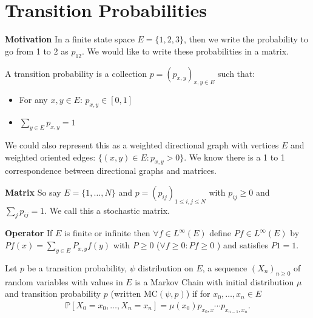 \section{Transition Probabilities}
\textbf{Motivation} In a finite state space $E=\{1,2,3\}$, then we write the probability to go from 1 to 2 as $p_{12}$. We would like to write these probabilities in a matrix.

\begin{defn}
	A transition probability is a collection $p=(p_{x,y})_{x,y \in E}$ such that:
	\begin{itemize}
		\item For any $x,y \in E$: $p_{x,y}\in [0,1]$ 
		\item $\sum_{y \in E} p_{x,y}=1$
	\end{itemize}
	
\end{defn}

We could also represent this as a weighted directional graph with vertices $E$ and weighted oriented edges: $\{(x,y) \in E: p_{x,y}>0\}$. We know there is a 1 to 1 correspondence between directional graphs and matrices.

\textbf{Matrix} So say $E=\{1,\ldots,N\}$ and $p=(p_{ij})_{1\leq i,j\leq N}$ with $p_{ij}\geq 0$ and $\sum_{j}p_{ij}=1$. We call this a stochastic matrix.

\textbf{Operator} If $E$ is finite or infinite then $\forall f \in L^\infty (E)$ define $Pf \in L^\infty (E)$ by  $Pf(x)=\sum_{y \in E}P_{x,y}f(y)$ with $P\geq 0 $ ($\forall  f \geq 0: Pf \geq 0$ ) and satisfies $P1=1$.

\begin{defn}
	Let $p$ be a transition probability, $\psi$ distribution on $E$, a sequence $(X_n)_{n\geq 0}$ of random variables with values in $E $ is a Markov Chain with initial distribution $\mu$ and transition probability $p$ (written $ \textrm{MC}(\psi, p)$) if for $x_0, \ldots, x_n \in E$
\begin{align}
	\boxed{ \mathbb{P} \left[ X_0=x_0, \ldots ,X_n=x_n \right] = \mu(x_0)p_{x_0,x} \cdots p_{x_{n-1},x_{n}} }
.\end{align}
\end{defn}

